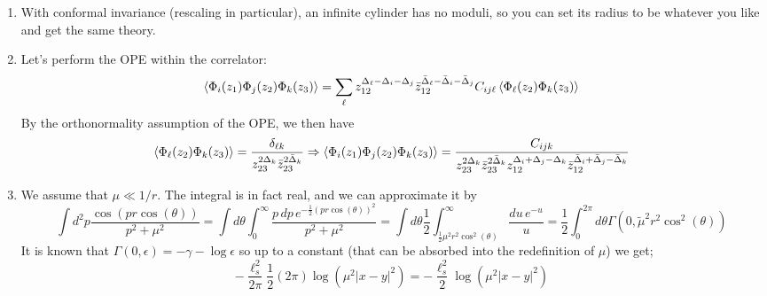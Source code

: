 \documentclass[11pt]{article}
\begin{document}
\begin{enumerate}
	 
	
%
	\item With conformal invariance (rescaling in particular), an infinite cylinder has no moduli, so you can set its radius to be whatever you like and get the same theory. 
	
	\item Let's perform the OPE within the correlator: 
	\[
		\braket{\Phi_i(z_1) \Phi_j(z_2) \Phi_k (z_3)} = \sum_{\ell} z_{12}^{\Delta_\ell - \Delta_i - \Delta_j} \bar z_{12}^{\bar \Delta_\ell - \bar \Delta_i - \bar \Delta_j} C_{ij\ell} \braket{ \Phi_{\ell}(z_2) \Phi_k(z_3)}
	\]
	By the orthonormality assumption of the OPE, we then have
	\[
	\braket{\Phi_\ell(z_2) \Phi_k (z_3)} = \frac{\delta_{\ell k}}{z_{23}^{2\Delta_k} \bar z_{23}^{2 \bar \Delta_k} }	\Rightarrow \braket{\Phi_i(z_1) \Phi_j(z_2) \Phi_k (z_3)} = \frac{C_{ijk}}{z_{23}^{2 \Delta_k} \bar z_{23}^{2 \bar \Delta_k} z_{12}^{\Delta_i+\Delta_j - \Delta_k} \bar z_{12}^{\bar \Delta_i+\bar \Delta_j - \bar \Delta_k} }
	\] 
	\item We assume that $\mu \ll 1/r$. The integral is in fact real, and we can approximate it by 
	\[
		\int d^2 p \frac{\cos(p r \cos(\theta))}{p^2 + \mu^2} = \int d\theta \int_0^\infty \frac{p\, dp\, e^{-\frac12 (p r \cos(\theta))^2}}{p^2 + \mu^2} = \int d\theta \frac12 \int_{\frac12 \mu^2 r^2 \cos^2(\theta)}^\infty \frac{du\, e^{-u}}{u} = \frac12 \int_{0}^{2\pi} d\theta \Gamma(0, \tilde \mu^2 r^2 \cos^2(\theta))
	\]
	It is known that $\Gamma(0, \epsilon) = -\gamma - \log \epsilon$ so up to a constant (that can be absorbed into the redefinition of $\mu$) we get;
	\[
		-\frac{\ell_s^2}{2\pi} \frac12 (2 \pi) \log(\mu^2 |x-y|^2) = - \frac{\ell_s^2}{2} \log(\mu^2 |x-y|^2)
	\]
	

\end{enumerate}
\end{document}
